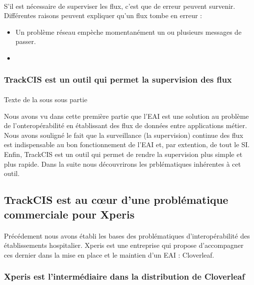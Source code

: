 			\paragraph{}%
			S'il est nécessaire de superviser les flux, c'est que de erreur peuvent
			survenir. Différentes raisons peuvent expliquer qu'un flux tombe en erreur
			:\newline
			\begin{itemize}
			  \item Un problème réseau empèche momentanément un ou plusieurs messages de
			  passer.
			  \item 
			\end{itemize}
			
		\subsubsection{TrackCIS est un outil qui permet la supervision des flux}
			\paragraph{}
			Texte de la sous sous partie
		
		Nous avons vu dans cette première partie que l'EAI est une solution au
		problème de l'onteropérabilité en établissant des flux de données entre
		applications métier. Nous avons souligné le fait que la surveillance (la
		supervision) continue des flux est indispensable au bon fonctionnement de
		l'EAI et, par extention, de tout le SI. Enfin, TrackCIS est un outil qui permet de rendre la
		supervision plus simple et plus rapide.\newline
		Dans la suite nous découvrirons les prblématiques inhérentes à cet outil.
		
	\subsection{TrackCIS est au cœur d'une problématique commerciale pour Xperis}
		\paragraph{}
		Précédement nous avons établi les bases des problématiques d'interopérabilité
		des établissements hospitalier. Xperis est une entreprise qui propose
		d'accompagner ces dernier dans la mise en place et le maintien d'un EAI :
		Cloverleaf.
		
		\subsubsection{Xperis est l'intermédiaire dans la distribution de Cloverleaf}

